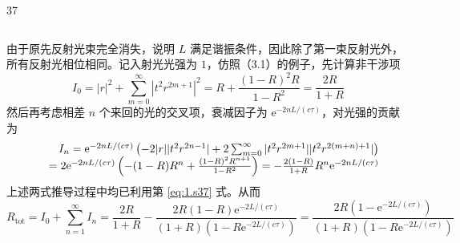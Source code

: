 \begin{solution}{37}
\begin{subsolution}
\begin{subsubsolution}
\begin{equation}
                \label{eq:14.s37}
            \end{equation}
        \end{subsubsolution}
        \begin{subsubsolution}
            由于原先反射光束完全消失，说明 $L$ 满足谐振条件，因此除了第一束反射光外，所有反射光相位相同。记入射光光强为 $1$，仿照（3.1）的例子，先计算非干涉项
            \begin{equation}
                I _ {0} = | r | ^ {2} + \sum_ {m = 0} ^ {\infty} \left| t ^ {2} r ^ {2 m + 1} \right| ^ {2} = R + \frac {(1 - R) ^ {2} R}{1 - R ^ {2}} = \frac {2 R}{1 + R}
                \label{eq:15.s37}
            \end{equation}
            然后再考虑相差 $n$ 个来回的光的交叉项，衰减因子为 $\mathrm{e}^{-2nL/(c\tau)}$，对光强的贡献为
            \begin{equation}
                \begin{array}{r l} I _ {n} = \mathrm{e} ^ {- 2 n L / (c \tau)} \left(- 2 | r | | t ^ {2} r ^ {2 n - 1} | + 2 \sum_ {m = 0} ^ {\infty} | t ^ {2} r ^ {2 m + 1} | | t ^ {2} r ^ {2 (m + n) + 1} |\right) \\ \quad = 2 \mathrm{e} ^ {- 2 n L / (c \tau)} \left(- (1 - R) R ^ {n} + \frac {(1 - R) ^ {2} R ^ {n + 1}}{1 - R ^ {2}}\right) = - \frac {2 (1 - R)}{1 + R} R ^ {n} \mathrm{e} ^ {- 2 n L / (c \tau)} \end{array}
                \label{eq:16.s37}
            \end{equation}
            上述两式推导过程中均已利用第 \eqref{eq:1.s37} 式。从而
            \begin{equation}
                R _ {\mathrm{tot}} = I _ {0} + \sum_ {n = 1} ^ {\infty} I _ {n} = \frac {2 R}{1 + R} - \frac {2 R (1 - R) \mathrm{e} ^ {- 2 L / (c \tau)}}{(1 + R) (1 - R \mathrm{e} ^ {- 2 L / (c \tau)})} = \frac {2 R (1 - \mathrm{e} ^ {- 2 L / (c \tau)})}{(1 + R) (1 - R \mathrm{e} ^ {- 2 L / (c \tau)})}
                \label{eq:17.s37}
            \end{equation}
        \end{subsubsolution}
    \end{subsolution}
\end{solution}